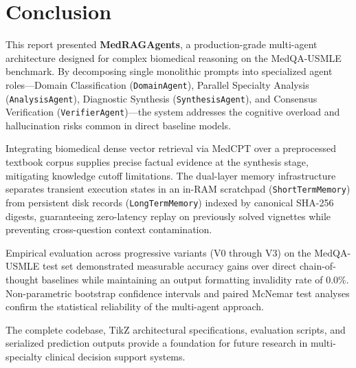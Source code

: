 \section{Conclusion}
\label{sec:conclusion}

This report presented \textbf{MedRAGAgents}, a production-grade multi-agent architecture designed for complex biomedical reasoning on the MedQA-USMLE benchmark. By decomposing single monolithic prompts into specialized agent roles—Domain Classification (\texttt{DomainAgent}), Parallel Specialty Analysis (\texttt{AnalysisAgent}), Diagnostic Synthesis (\texttt{SynthesisAgent}), and Consensus Verification (\texttt{VerifierAgent})—the system addresses the cognitive overload and hallucination risks common in direct baseline models.

Integrating biomedical dense vector retrieval via MedCPT over a preprocessed textbook corpus supplies precise factual evidence at the synthesis stage, mitigating knowledge cutoff limitations. The dual-layer memory infrastructure separates transient execution states in an in-RAM scratchpad (\texttt{ShortTermMemory}) from persistent disk records (\texttt{LongTermMemory}) indexed by canonical SHA-256 digests, guaranteeing zero-latency replay on previously solved vignettes while preventing cross-question context contamination.

Empirical evaluation across progressive variants (V0 through V3) on the MedQA-USMLE test set demonstrated measurable accuracy gains over direct chain-of-thought baselines while maintaining an output formatting invalidity rate of $0.0\%$. Non-parametric bootstrap confidence intervals and paired McNemar test analyses confirm the statistical reliability of the multi-agent approach. 

The complete codebase, TikZ architectural specifications, evaluation scripts, and serialized prediction outputs provide a foundation for future research in multi-specialty clinical decision support systems.
